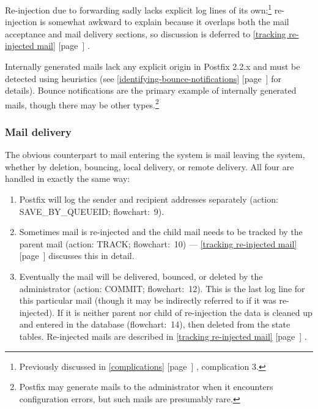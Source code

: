 \documentclass[a4paper,12pt,draft]{article}
\newcommand{\refwithpage}[1]{%
    \empty{}\ref{#1} [page~\pageref{#1}]%
}
\newcommand{\sectionref}[1]{%
    \textsection{}\refwithpage{#1}%
}
\begin{document}
Re-injection due to forwarding sadly lacks explicit log lines of its
own;\footnote{Previously discussed in \sectionref{complications},
complication 3.} re-injection is somewhat awkward to explain because it
overlaps both the mail acceptance and mail delivery sections, so discussion
is deferred to \sectionref{tracking re-injected mail}.

Internally generated mails lack any explicit origin in Postfix 2.2.x and
must be detected using heuristics (see
\sectionref{identifying-bounce-notifications} for details).  Bounce
notifications are the primary example of internally generated mails, though
there may be other types.\footnote{Postfix may generate mails to the
administrator when it encounters configuration errors, but such mails are
presumably rare.}

\subsubsection{Mail delivery}

\label{mail-delivery}

The obvious counterpart to mail entering the system is mail leaving the
system, whether by deletion, bouncing, local delivery, or remote delivery.
All four are handled in exactly the same way:

\begin{enumerate}

    \item Postfix will log the sender and recipient addresses separately
        (action: SAVE\_BY\_QUEUEID\@; flowchart:~9).

    \item Sometimes mail is re-injected and the child mail needs to be
        tracked by the parent mail (action: TRACK\@; flowchart:~10) ---
        \sectionref{tracking re-injected mail} discusses this in
        detail.

    \item Eventually the mail will be delivered, bounced, or deleted by the
        administrator (action: COMMIT\@; flowchart:~12).  This is the last
        log line for this particular mail (though it may be indirectly
        referred to if it was re-injected).  If it is neither parent nor
        child of re-injection the data is cleaned up and entered in the
        database (flowchart:~14), then deleted from the state tables.
        Re-injected mails are described in \sectionref{tracking re-injected
        mail}.

\end{enumerate}
\end{document}
